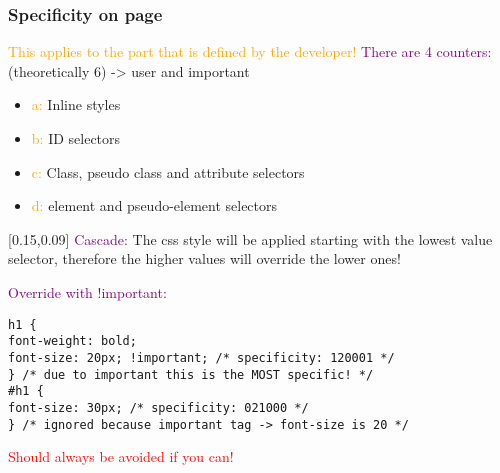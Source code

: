 \documentclass[main.tex,fontsize=6pt,paper=a4,paper=landscape,DIV=calc,]{scrartcl}
\begin{document}
\begin{multicols*}{4}
\subsubsection{Specificity on page}
\textcolor{orange}{This applies to the part that is defined by the developer!}\newline
\textcolor{purple}{There are 4 counters:} (theoretically 6) -> user and important
\begin{itemize}
\item \textcolor{orange}{a:} Inline styles
\item \textcolor{orange}{b:} ID selectors
\item \textcolor{orange}{c:} Class, pseudo class and attribute selectors
\item \textcolor{orange}{d:} element and pseudo-element selectors
\end{itemize}
[0.15,0.09]
\textcolor{purple}{Cascade:}\newline
The css style will be applied starting with the lowest value selector, therefore the higher values will override the lower ones!

\textcolor{purple}{Override with !important:}
\vspace{-2mm}
\begin{lstlisting}
h1 {
font-weight: bold;
font-size: 20px; !important; /* specificity: 120001 */
} /* due to important this is the MOST specific! */
#h1 {
font-size: 30px; /* specificity: 021000 */
} /* ignored because important tag -> font-size is 20 */
\end{lstlisting}
\vspace{2mm}
\textcolor{red}{Should always be avoided if you can!}


\end{multicols*}
\end{document}
